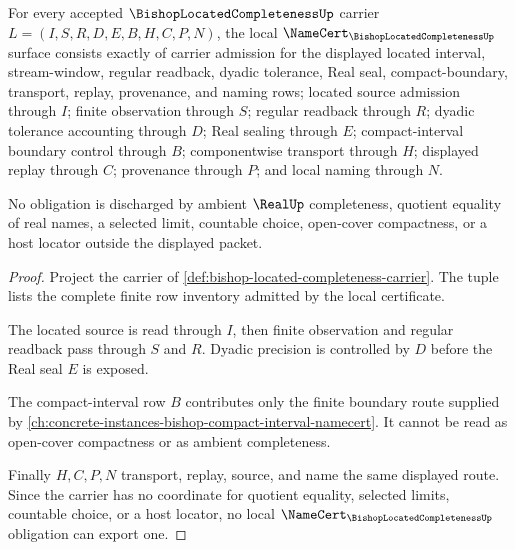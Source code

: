 \begin{theorem}
\label{thm:bishop-located-completeness-namecert-obligations}
For every accepted $\BishopLocatedCompletenessUp$ carrier $L=(I,S,R,D,E,B,H,C,P,N)$, the local $\NameCert_{\BishopLocatedCompletenessUp}$ surface consists exactly of carrier admission for the displayed located interval, stream-window, regular readback, dyadic tolerance, Real seal, compact-boundary, transport, replay, provenance, and naming rows; located source admission through $I$; finite observation through $S$; regular readback through $R$; dyadic tolerance accounting through $D$; Real sealing through $E$; compact-interval boundary control through $B$; componentwise transport through $H$; displayed replay through $C$; provenance through $P$; and local naming through $N$.

No obligation is discharged by ambient $\RealUp$ completeness, quotient equality of real names, a selected limit, countable choice, open-cover compactness, or a host locator outside the displayed packet.
\end{theorem}
\begin{proof}
Project the carrier of \autoref{def:bishop-located-completeness-carrier}. The tuple lists the complete finite row inventory admitted by the local certificate.

The located source is read through $I$, then finite observation and regular readback pass through $S$ and $R$. Dyadic precision is controlled by $D$ before the Real seal $E$ is exposed.

The compact-interval row $B$ contributes only the finite boundary route supplied by \autoref{ch:concrete-instances-bishop-compact-interval-namecert}. It cannot be read as open-cover compactness or as ambient completeness.

Finally $H,C,P,N$ transport, replay, source, and name the same displayed route. Since the carrier has no coordinate for quotient equality, selected limits, countable choice, or a host locator, no local $\NameCert_{\BishopLocatedCompletenessUp}$ obligation can export one.
\end{proof}


